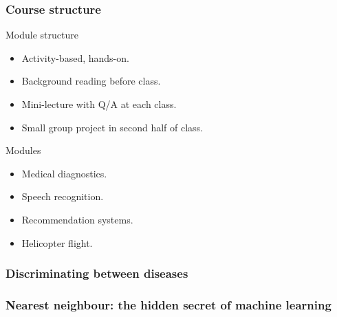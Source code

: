 \documentclass{beamer}
\begin{document}
\begin{frame}
  \frametitle{Course structure}
  \begin{block}{Module structure}
    \begin{itemize}
    \item \alert{Activity}-based, hands-on.
    \item Background reading \alert{before} class.
    \item Mini-lecture with \alert{Q/A} at each class.
    \item Small \alert{group project} in second half of class.
    \end{itemize}
  \end{block}

  \begin{block}{Modules}
    \begin{itemize}
    \item Medical diagnostics.
    \item Speech recognition.
    \item Recommendation systems.
    \item Helicopter flight.
    \end{itemize}
  \end{block}
\end{frame}


\begin{frame}
  \frametitle{Discriminating between diseases}
  
\end{frame}

\begin{frame}
  \frametitle{Nearest neighbour: the hidden secret of machine learning}
  
\end{frame}
\end{document}
